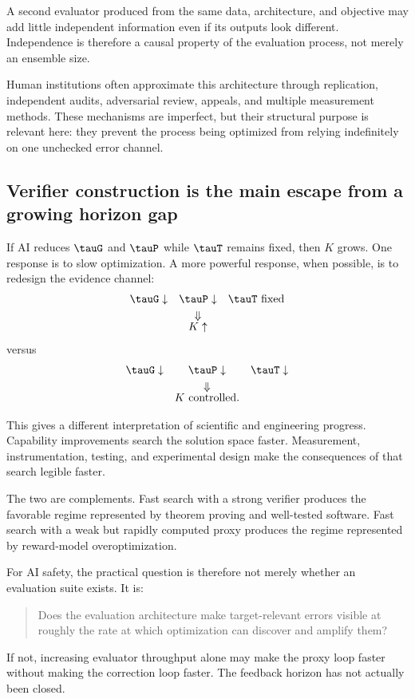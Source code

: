 A second evaluator produced from the same data, architecture, and objective may add
little independent information even if its outputs look different.  Independence is
therefore a causal property of the evaluation process, not merely an ensemble size.

Human institutions often approximate this architecture through replication,
independent audits, adversarial review, appeals, and multiple measurement methods.
These mechanisms are imperfect, but their structural purpose is relevant here: they
prevent the process being optimized from relying indefinitely on one unchecked error
channel.

\subsection{Verifier construction is the main escape from a growing horizon gap}

If AI reduces \(\tauG\) and \(\tauP\) while \(\tauT\) remains fixed, then \(K\)
grows.  One response is to slow optimization.  A more powerful response, when
possible, is to redesign the evidence channel:
\[
\begin{array}{ccc}
\tauG \downarrow
&
\tauP \downarrow
&
\tauT \text{ fixed}
\\[3pt]
&\Downarrow&
\\[-2pt]
&K\uparrow&
\end{array}
\]
versus
\[
\begin{array}{ccc}
\tauG \downarrow
&
\tauP \downarrow
&
\tauT \downarrow
\\[3pt]
&\Downarrow&
\\[-2pt]
&K\text{ controlled}.&
\end{array}
\]

This gives a different interpretation of scientific and engineering progress.
Capability improvements search the solution space faster.  Measurement,
instrumentation, testing, and experimental design make the consequences of that
search legible faster.

The two are complements.  Fast search with a strong verifier produces the favorable
regime represented by theorem proving and well-tested software.  Fast search with a
weak but rapidly computed proxy produces the regime represented by reward-model
overoptimization.

For AI safety, the practical question is therefore not merely whether an evaluation
suite exists.  It is:

\begin{quote}
Does the evaluation architecture make target-relevant errors visible at roughly the
rate at which optimization can discover and amplify them?
\end{quote}

If not, increasing evaluator throughput alone may make the proxy loop faster without
making the correction loop faster.  The feedback horizon has not actually been
closed.
